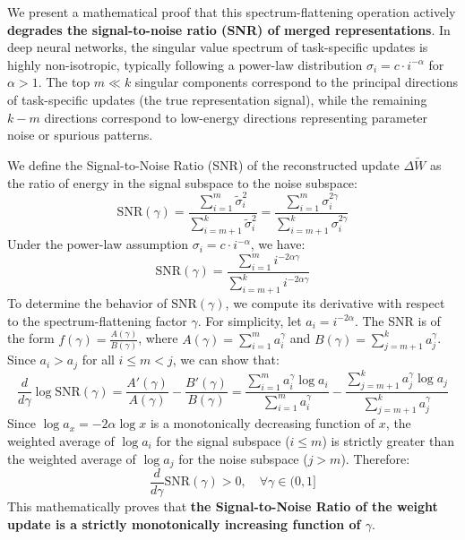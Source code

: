 \documentclass{article}
\begin{document}
We present a mathematical proof that this spectrum-flattening operation actively \textbf{degrades the signal-to-noise ratio (SNR) of merged representations}. In deep neural networks, the singular value spectrum of task-specific updates is highly non-isotropic, typically following a power-law distribution $\sigma_i = c \cdot i^{-\alpha}$ for $\alpha > 1$. The top $m \ll k$ singular components correspond to the principal directions of task-specific updates (the true representation signal), while the remaining $k-m$ directions correspond to low-energy directions representing parameter noise or spurious patterns.

We define the Signal-to-Noise Ratio (SNR) of the reconstructed update $\Delta \tilde{W}$ as the ratio of energy in the signal subspace to the noise subspace:
\begin{equation}
    \text{SNR}(\gamma) = \frac{\sum_{i=1}^m \tilde{\sigma}_i^2}{\sum_{i=m+1}^k \tilde{\sigma}_i^2} = \frac{\sum_{i=1}^m \sigma_i^{2\gamma}}{\sum_{i=m+1}^k \sigma_i^{2\gamma}}
\end{equation}
Under the power-law assumption $\sigma_i = c \cdot i^{-\alpha}$, we have:
\begin{equation}
    \text{SNR}(\gamma) = \frac{\sum_{i=1}^m i^{-2\alpha\gamma}}{\sum_{i=m+1}^k i^{-2\alpha\gamma}}
\end{equation}
To determine the behavior of $\text{SNR}(\gamma)$, we compute its derivative with respect to the spectrum-flattening factor $\gamma$. For simplicity, let $a_i = i^{-2\alpha}$. The SNR is of the form $f(\gamma) = \frac{A(\gamma)}{B(\gamma)}$, where $A(\gamma) = \sum_{i=1}^m a_i^\gamma$ and $B(\gamma) = \sum_{j=m+1}^k a_j^\gamma$. Since $a_i > a_j$ for all $i \le m < j$, we can show that:
\begin{equation}
    \frac{d}{d\gamma} \log \text{SNR}(\gamma) = \frac{A'(\gamma)}{A(\gamma)} - \frac{B'(\gamma)}{B(\gamma)} = \frac{\sum_{i=1}^m a_i^\gamma \log a_i}{\sum_{i=1}^m a_i^\gamma} - \frac{\sum_{j=m+1}^k a_j^\gamma \log a_j}{\sum_{j=m+1}^k a_j^\gamma}
\end{equation}
Since $\log a_x = -2\alpha \log x$ is a monotonically decreasing function of $x$, the weighted average of $\log a_i$ for the signal subspace ($i \le m$) is strictly greater than the weighted average of $\log a_j$ for the noise subspace ($j > m$). Therefore:
\begin{equation}
    \frac{d}{d\gamma} \text{SNR}(\gamma) > 0, \quad \forall \gamma \in (0, 1]
\end{equation}
This mathematically proves that \textbf{the Signal-to-Noise Ratio of the weight update is a strictly monotonically increasing function of $\gamma$}. 
\end{document}
